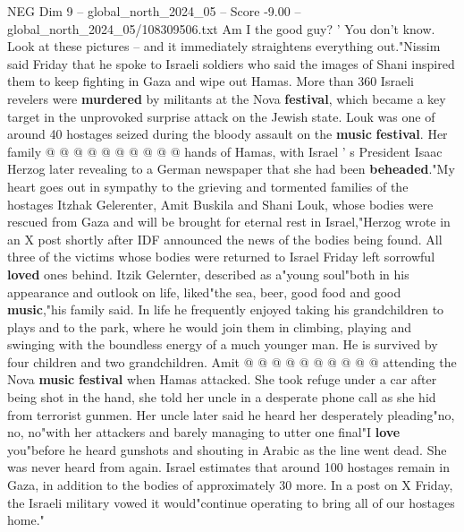 \begin{textsample}{NEG Dim 9 – global\_north\_2024\_05 – Score -9.00 – global\_north\_2024\_05/108309506.txt}
Am I the good guy? ' You don't know.
Look at these pictures -- and it immediately straightens everything out."Nissim said Friday that he spoke to Israeli soldiers who said the images of Shani inspired them to keep fighting in Gaza and wipe out Hamas.
More than 360 Israeli revelers were \textbf{murdered} by militants at the Nova \textbf{festival}, which became a key target in the unprovoked surprise attack on the Jewish state.
Louk was one of around 40 hostages seized during the bloody assault on the \textbf{music} \textbf{festival}.
Her family @ @ @ @ @ @ @ @ @ @ hands of Hamas, with Israel ' s President Isaac Herzog later revealing to a German newspaper that she had been \textbf{beheaded}."My heart goes out in sympathy to the grieving and tormented families of the hostages Itzhak Gelerenter, Amit Buskila and Shani Louk, whose bodies were rescued from Gaza and will be brought for eternal rest in Israel,"Herzog wrote in an X post shortly after IDF announced the news of the bodies being found.
All three of the victims whose bodies were returned to Israel Friday left sorrowful \textbf{loved} ones behind.
Itzik Gelernter, described as a"young soul"both in his appearance and outlook on life, liked"the sea, beer, good food and good \textbf{music},"his family said.
In life he frequently enjoyed taking his grandchildren to plays and to the park, where he would join them in climbing, playing and swinging with the boundless energy of a much younger man.
He is survived by four children and two grandchildren.
Amit @ @ @ @ @ @ @ @ @ @ attending the Nova \textbf{music} \textbf{festival} when Hamas attacked.
She took refuge under a car after being shot in the hand, she told her uncle in a desperate phone call as she hid from terrorist gunmen.
Her uncle later said he heard her desperately pleading"no, no, no"with her attackers and barely managing to utter one final"I \textbf{love} you"before he heard gunshots and shouting in Arabic as the line went dead.
She was never heard from again.
Israel estimates that around 100 hostages remain in Gaza, in addition to the bodies of approximately 30 more.
In a post on X Friday, the Israeli military vowed it would"continue operating to bring all of our hostages home."

\end{textsample}
